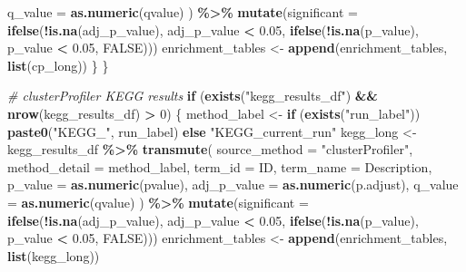 \documentclass[
]{article}
\newenvironment{Shaded}{\begin{snugshade}}{\end{snugshade}}
\newcommand{\AttributeTok}[1]{\textcolor[rgb]{0.13,0.29,0.53}{#1}}
\newcommand{\CommentTok}[1]{\textcolor[rgb]{0.56,0.35,0.01}{\textit{#1}}}
\newcommand{\ConstantTok}[1]{\textcolor[rgb]{0.56,0.35,0.01}{#1}}
\newcommand{\ControlFlowTok}[1]{\textcolor[rgb]{0.13,0.29,0.53}{\textbf{#1}}}
\newcommand{\DecValTok}[1]{\textcolor[rgb]{0.00,0.00,0.81}{#1}}
\newcommand{\FloatTok}[1]{\textcolor[rgb]{0.00,0.00,0.81}{#1}}
\newcommand{\FunctionTok}[1]{\textcolor[rgb]{0.13,0.29,0.53}{\textbf{#1}}}
\newcommand{\NormalTok}[1]{#1}
\newcommand{\OtherTok}[1]{\textcolor[rgb]{0.56,0.35,0.01}{#1}}
\newcommand{\SpecialCharTok}[1]{\textcolor[rgb]{0.81,0.36,0.00}{\textbf{#1}}}
\newcommand{\StringTok}[1]{\textcolor[rgb]{0.31,0.60,0.02}{#1}}
\begin{document}
\begin{Shaded}
\begin{Highlighting}[]
        \AttributeTok{q\_value =} \FunctionTok{as.numeric}\NormalTok{(qvalue)}
\NormalTok{      ) }\SpecialCharTok{\%\textgreater{}\%}
      \FunctionTok{mutate}\NormalTok{(}\AttributeTok{significant =} \FunctionTok{ifelse}\NormalTok{(}\SpecialCharTok{!}\FunctionTok{is.na}\NormalTok{(adj\_p\_value), adj\_p\_value }\SpecialCharTok{\textless{}} \FloatTok{0.05}\NormalTok{, }\FunctionTok{ifelse}\NormalTok{(}\SpecialCharTok{!}\FunctionTok{is.na}\NormalTok{(p\_value), p\_value }\SpecialCharTok{\textless{}} \FloatTok{0.05}\NormalTok{, }\ConstantTok{FALSE}\NormalTok{)))}
\NormalTok{    enrichment\_tables }\OtherTok{\textless{}{-}} \FunctionTok{append}\NormalTok{(enrichment\_tables, }\FunctionTok{list}\NormalTok{(cp\_long))}
\NormalTok{  \}}
\NormalTok{\}}

\CommentTok{\# clusterProfiler KEGG results}
\ControlFlowTok{if}\NormalTok{ (}\FunctionTok{exists}\NormalTok{(}\StringTok{"kegg\_results\_df"}\NormalTok{) }\SpecialCharTok{\&\&} \FunctionTok{nrow}\NormalTok{(kegg\_results\_df) }\SpecialCharTok{\textgreater{}} \DecValTok{0}\NormalTok{) \{}
\NormalTok{  method\_label }\OtherTok{\textless{}{-}} \ControlFlowTok{if}\NormalTok{ (}\FunctionTok{exists}\NormalTok{(}\StringTok{"run\_label"}\NormalTok{)) }\FunctionTok{paste0}\NormalTok{(}\StringTok{"KEGG\_"}\NormalTok{, run\_label) }\ControlFlowTok{else} \StringTok{"KEGG\_current\_run"}
\NormalTok{  kegg\_long }\OtherTok{\textless{}{-}}\NormalTok{ kegg\_results\_df }\SpecialCharTok{\%\textgreater{}\%}
    \FunctionTok{transmute}\NormalTok{(}
      \AttributeTok{source\_method =} \StringTok{"clusterProfiler"}\NormalTok{,}
      \AttributeTok{method\_detail =}\NormalTok{ method\_label,}
      \AttributeTok{term\_id =}\NormalTok{ ID,}
      \AttributeTok{term\_name =}\NormalTok{ Description,}
      \AttributeTok{p\_value =} \FunctionTok{as.numeric}\NormalTok{(pvalue),}
      \AttributeTok{adj\_p\_value =} \FunctionTok{as.numeric}\NormalTok{(p.adjust),}
      \AttributeTok{q\_value =} \FunctionTok{as.numeric}\NormalTok{(qvalue)}
\NormalTok{    ) }\SpecialCharTok{\%\textgreater{}\%}
    \FunctionTok{mutate}\NormalTok{(}\AttributeTok{significant =} \FunctionTok{ifelse}\NormalTok{(}\SpecialCharTok{!}\FunctionTok{is.na}\NormalTok{(adj\_p\_value), adj\_p\_value }\SpecialCharTok{\textless{}} \FloatTok{0.05}\NormalTok{, }\FunctionTok{ifelse}\NormalTok{(}\SpecialCharTok{!}\FunctionTok{is.na}\NormalTok{(p\_value), p\_value }\SpecialCharTok{\textless{}} \FloatTok{0.05}\NormalTok{, }\ConstantTok{FALSE}\NormalTok{)))}
\NormalTok{  enrichment\_tables }\OtherTok{\textless{}{-}} \FunctionTok{append}\NormalTok{(enrichment\_tables, }\FunctionTok{list}\NormalTok{(kegg\_long))}

\end{Highlighting}
\end{Shaded}
\end{document}
